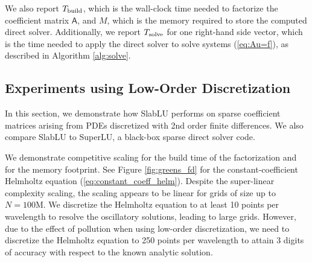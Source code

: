 \documentclass[11pt]{amsart}
\newcommand{\mtx}[1]{\bm{\mathsf{#1}}}
\begin{document}
We also report $T_{\rm build}$, which is the wall-clock time needed to factorize the coefficient matrix $\mtx A$, and $M$, 
which is the memory required to store the computed direct solver. Additionally, we report $T_{\rm solve}$ for one right-hand side vector, 
which is the time needed to apply the direct solver to solve systems (\ref{eq:Au=f}), as described in Algorithm \ref{alg:solve}.

\subsection{Experiments using Low-Order Discretization}

In this section, we demonstrate how SlabLU performs on sparse coefficient matrices arising from PDEs discretized with 2nd order finite differences.
We also compare SlabLU to SuperLU, a black-box sparse direct solver code.

We demonstrate competitive scaling for the build time of the factorization and for the memory footprint. 
See Figure \ref{fig:greens_fd} for the constant-coefficient Helmholtz equation (\ref{eq:constant_coeff_helm}).
Despite the super-linear complexity scaling, the scaling appears to be linear for grids of size up to $N=100$M.
We discretize the Helmholtz equation to at least 10 points per wavelength to resolve the oscillatory solutions,
leading to large grids. However, due to the effect of pollution when using low-order discretization, 
we need to discretize the Helmholtz equation to 250 points per wavelength
to attain 3 digits of accuracy with respect to the known analytic solution.
\end{document}
